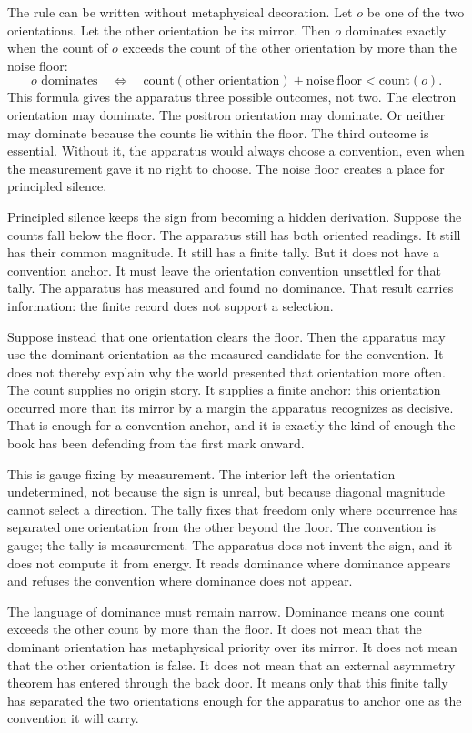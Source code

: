 The rule can be written without metaphysical decoration. Let \(o\) be one of
the two orientations. Let the other orientation be its mirror. Then \(o\)
dominates exactly when the count of \(o\) exceeds the count of the other
orientation by more than the noise floor:
\[
  \text{$o$ dominates}
  \quad\Longleftrightarrow\quad
  \mathrm{count}(\text{other orientation}) + \mathrm{noise\ floor} < \mathrm{count}(o).
\]
This formula gives the apparatus three possible outcomes, not two. The electron
orientation may dominate. The positron orientation may dominate. Or neither may
dominate because the counts lie within the floor. The third outcome is
essential. Without it, the apparatus would always choose a convention, even
when the measurement gave it no right to choose. The noise floor creates a
place for principled silence.

Principled silence keeps the sign from becoming a hidden derivation. Suppose
the counts fall below the floor. The apparatus still has both oriented
readings. It still has their common magnitude. It still has a finite tally. But
it does not have a convention anchor. It must leave the orientation convention
unsettled for that tally. The apparatus has measured and found no dominance.
That result carries information: the finite record does not support a
selection.

Suppose instead that one orientation clears the floor. Then the apparatus may
use the dominant orientation as the measured candidate for the convention. It
does not thereby explain why the world presented that orientation more often.
The count supplies no origin story. It supplies a finite anchor: this
orientation occurred more than its mirror by a margin the apparatus recognizes
as decisive. That is enough for a convention anchor, and it is exactly the kind
of enough the book has been defending from the first mark onward.

This is gauge fixing by measurement. The interior left the orientation
undetermined, not because the sign is unreal, but because diagonal magnitude
cannot select a direction. The tally fixes that freedom only where occurrence
has separated one orientation from the other beyond the floor. The convention
is gauge; the tally is measurement. The apparatus does not invent the sign, and
it does not compute it from energy. It reads dominance where dominance appears
and refuses the convention where dominance does not appear.

The language of dominance must remain narrow. Dominance means one count exceeds
the other count by more than the floor. It does not mean that the dominant
orientation has metaphysical priority over its mirror. It does not mean that
the other orientation is false. It does not mean that an external asymmetry
theorem has entered through the back door. It means only that this finite tally
has separated the two orientations enough for the apparatus to anchor one as
the convention it will carry.

